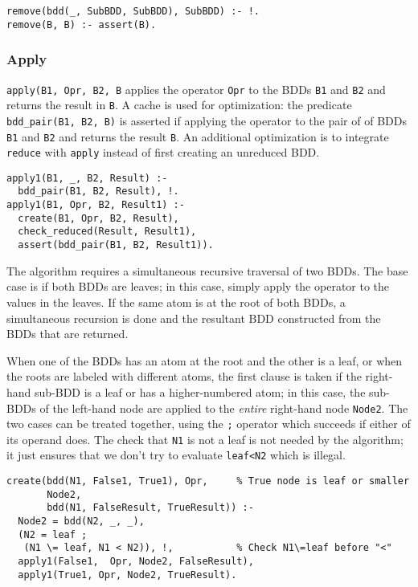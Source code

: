 \documentclass[11pt]{article}
\newcommand*{\p}[1]{\textup{\texttt{#1}}}
\begin{document}
\begin{verbatim}
remove(bdd(_, SubBDD, SubBDD), SubBDD) :- !.
remove(B, B) :- assert(B).
\end{verbatim}

\subsubsection{Apply}

\p{apply(B1, Opr, B2, B} applies the operator \p{Opr} to
the BDDs \p{B1} and \p{B2} and returns the result in \p{B}. A cache is
used for optimization: the predicate \p{bdd\_pair(B1, B2, B)} is
asserted if applying the operator to the pair of of BDDs \p{B1} and
\p{B2} and returns the result \p{B}. An additional optimization is to
integrate \p{reduce} with \p{apply} instead of first creating an
unreduced BDD.

\begin{verbatim}
apply1(B1, _, B2, Result) :-
  bdd_pair(B1, B2, Result), !.
apply1(B1, Opr, B2, Result1) :-
  create(B1, Opr, B2, Result),
  check_reduced(Result, Result1),
  assert(bdd_pair(B1, B2, Result1)).
\end{verbatim}

The algorithm requires a simultaneous recursive traversal of two BDDs.
The base case is if both BDDs are leaves; in this case, simply apply the
operator to the values in the leaves. If the same atom is at the root of
both BDDs, a simultaneous recursion is done and the resultant BDD
constructed from the BDDs that are returned.

When one of the BDDs has an atom at the root and the other is a leaf, or
when the roots are labeled with different atoms, the first clause is
taken if the right-hand sub-BDD is a leaf or has a higher-numbered atom;
in this case, the sub-BDDs of the left-hand node are applied to the
\emph{entire} right-hand node \p{Node2}. The two cases can be treated
together, using the \p{;} operator which succeeds if either of its
operand does. The check that \p{N1} is not a leaf is not needed by the
algorithm; it just ensures that we don't try to evaluate \p{leaf<N2}
which is illegal.

\begin{verbatim}
create(bdd(N1, False1, True1), Opr,     % True node is leaf or smaller
       Node2,
       bdd(N1, FalseResult, TrueResult)) :-
  Node2 = bdd(N2, _, _),                   
  (N2 = leaf ;
   (N1 \= leaf, N1 < N2)), !,           % Check N1\=leaf before "<"
  apply1(False1,  Opr, Node2, FalseResult),
  apply1(True1, Opr, Node2, TrueResult).
\end{verbatim}
\end{document}

